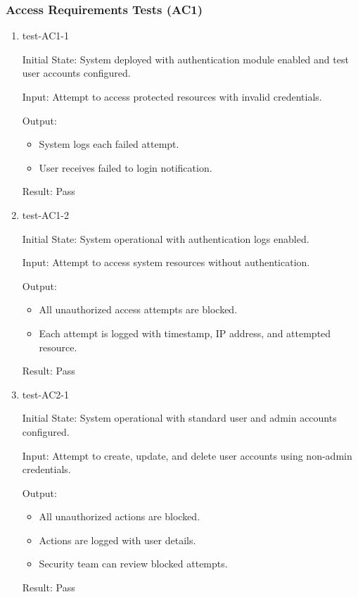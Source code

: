 \documentclass[12pt, titlepage]{article}
\begin{document}
\subsubsection{Access Requirements Tests (AC1)} \label{section:4.10.1}

\begin{enumerate}
\item test-AC1-1 \label{test-AC1-1}

Initial State: System deployed with authentication module enabled and test user accounts configured.

Input: Attempt to access protected resources with invalid credentials.

Output:
\begin{itemize}
\item System logs each failed attempt.
\item User receives failed to login notification.
\end{itemize}

Result: Pass

\item test-AC1-2 \label{test-AC1-2}

Initial State: System operational with authentication logs enabled.

Input: Attempt to access system resources without authentication.

Output: 
\begin{itemize}
    \item All unauthorized access attempts are blocked.
    \item Each attempt is logged with timestamp, IP address, and attempted resource.
\end{itemize}

Result: Pass

\item test-AC2-1 \label{test-AC2-1}

Initial State: System operational with standard user and admin accounts configured.

Input: Attempt to create, update, and delete user accounts using non-admin credentials.

Output:
\begin{itemize}
\item All unauthorized actions are blocked.
\item Actions are logged with user details.
\item Security team can review blocked attempts.
\end{itemize}

Result: Pass

\end{enumerate}
\end{document}
